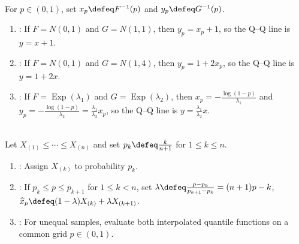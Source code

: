 \begin{example} \label{ex:normal-and-exponential-qq-lines} \\
For $p\in(0,1)$, set $x_p\defeq F^{-1}(p)$ and $y_p\defeq G^{-1}(p)$.
\begin{enumerate}[label=(\roman*)]
\setlength{\itemsep}{0pt}
\item {}: If $F=N(0,1)$ and $G=N(1,1)$, then $y_p=x_p+1$, so the Q--Q line is $y=x+1$.
\item {}: If $F=N(0,1)$ and $G=N(1,4)$, then $y_p=1+2x_p$, so the Q--Q line is $y=1+2x$.
\item {}: If $F=\operatorname{Exp}(\lambda_1)$ and $G=\operatorname{Exp}(\lambda_2)$, then $x_p=-\frac{\log(1-p)}{\lambda_1}$ and $y_p=-\frac{\log(1-p)}{\lambda_2}=\frac{\lambda_1}{\lambda_2}x_p$, so the Q--Q line is $y=\frac{\lambda_1}{\lambda_2}x$.
\end{enumerate}
\end{example}

\begin{method} \label{meth:interpolated-empirical-quantile} \\
Let $X_{(1)}\leq\cdots\leq X_{(n)}$ and set $p_k\defeq\frac{k}{n+1}$ for $1\leq k\leq n$.
\begin{enumerate}[label=(\roman*)]
\setlength{\itemsep}{0pt}
\item {}: Assign $X_{(k)}$ to probability $p_k$.
\item {}: If $p_k\leq p\leq p_{k+1}$ for $1\leq k<n$, set $\lambda\defeq\frac{p-p_k}{p_{k+1}-p_k}=(n+1)p-k$, $\widehat{x}_p\defeq(1-\lambda)X_{(k)}+\lambda X_{(k+1)}$.
\item {}: For unequal samples, evaluate both interpolated quantile functions on a common grid $p\in(0,1)$.
\end{enumerate}
\end{method}

